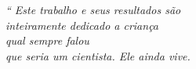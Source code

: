 \begin{epigrafe}
	\vspace*{\fill}
	\begin{flushright}
		\textit{``
		Este trabalho e seus resultados são
		\\ inteiramente dedicado a criança
		\\ qual sempre falou 
		\\ que seria um cientista. Ele ainda vive.}
	\end{flushright}
\end{epigrafe}
